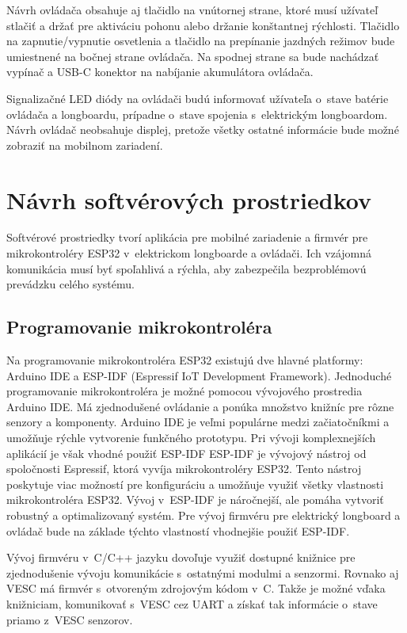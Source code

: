 Návrh ovládača obsahuje aj tlačidlo na vnútornej strane, ktoré musí užívateľ stlačiť a držať pre aktiváciu pohonu alebo držanie konštantnej rýchlosti.
Tlačidlo na zapnutie/vypnutie osvetlenia a tlačidlo na prepínanie jazdných režimov bude umiestnené na bočnej strane ovládača.
Na spodnej strane sa bude nachádzať vypínač a USB-C konektor na nabíjanie akumulátora ovládača. 

Signalizačné LED diódy na ovládači budú informovať užívateľa o~stave batérie ovládača a longboardu, prípadne o~stave spojenia s~elektrickým longboardom.
Návrh ovládač neobsahuje displej, pretože všetky ostatné informácie bude možné zobraziť na mobilnom zariadení.

\section{Návrh softvérových prostriedkov}

Softvérové prostriedky tvorí aplikácia pre mobilné zariadenie a firmvér pre mikrokontroléry ESP32 v~elektrickom longboarde a ovládači.
Ich vzájomná komunikácia musí byť spoľahlivá a rýchla, aby zabezpečila bezproblémovú prevádzku celého systému.

\subsection{Programovanie mikrokontroléra}

Na programovanie mikrokontroléra ESP32 existujú dve hlavné platformy: Arduino IDE a ESP-IDF (Espressif IoT Development Framework).
Jednoduché programovanie mikrokontroléra je možné pomocou vývojového prostredia Arduino IDE.
Má zjednodušené ovládanie a ponúka množstvo knižníc pre rôzne senzory a komponenty.
Arduino IDE je veľmi populárne medzi začiatočníkmi a umožňuje rýchle vytvorenie funkčného prototypu.\cite{Arduino}
Pri vývoji komplexnejších aplikácií je však vhodné použiť ESP-IDF
ESP-IDF je vývojový nástroj od spoločnosti Espressif, ktorá vyvíja mikrokontroléry ESP32.
Tento nástroj poskytuje viac možností pre konfiguráciu a umožňuje využiť všetky vlastnosti mikrokontroléra ESP32.
Vývoj v~ESP-IDF je náročnejší, ale pomáha vytvoriť robustný a optimalizovaný systém.\cite{EspressifIDF}
Pre vývoj firmvéru pre elektrický longboard a ovládač bude na základe týchto vlastností vhodnejšie použiť ESP-IDF.

Vývoj firmvéru v~C/C++ jazyku dovoľuje využiť dostupné knižnice pre zjednodušenie vývoju komunikácie s~ostatnými modulmi a senzormi. 
Rovnako aj VESC má firmvér s~otvoreným zdrojovým kódom v~C.
Takže je možné vďaka knižniciam, komunikovať s~VESC cez UART a získať tak informácie o~stave priamo z~VESC senzorov.

